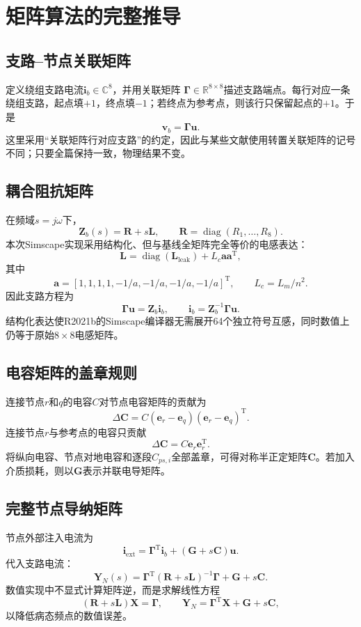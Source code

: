 \documentclass[UTF8,12pt,a4paper]{ctexart}
\newcommand{\Yn}{\bm{Y}_{N}}
\newcommand{\Zb}{\bm{Z}_{b}}
\newcommand{\Cmat}{\bm{C}}
\newcommand{\Gmat}{\bm{G}}
\newcommand{\Rmat}{\bm{R}}
\newcommand{\Lmat}{\bm{L}}
\newcommand{\Gam}{\bm{\Gamma}}
\begin{document}
\section{矩阵算法的完整推导}

\subsection{支路--节点关联矩阵}
定义绕组支路电流\(\bm{i}_b\in\mathbb{C}^{8}\)，并用关联矩阵
\(\Gam\in\mathbb{R}^{8\times 8}\)描述支路端点。每行对应一条绕组支路，起点填\( +1 \)，终点填\(-1\)；若终点为参考点，则该行只保留起点的\( +1 \)。于是
\[
\bm{v}_b=\Gam\bm{u}.
\]
这里采用“关联矩阵行对应支路”的约定，因此与某些文献使用转置关联矩阵的记号不同；只要全篇保持一致，物理结果不变。

\subsection{耦合阻抗矩阵}
在频域\(s=j\omega\)下，
\[
\Zb(s)=\Rmat+s\Lmat,\qquad
\Rmat=\operatorname{diag}(R_1,\ldots,R_8).
\]
本次Simscape实现采用结构化、但与基线全矩阵完全等价的电感表达：
\[
\boxed{\Lmat=
\operatorname{diag}(\bm{L}_{\mathrm{leak}})
+L_c\bm{a}\bm{a}^{\mathrm T}},
\]
其中
\[
\bm{a}=[1,1,1,1,-1/a,-1/a,-1/a,-1/a]^{\mathrm T},
\qquad L_c=L_m/n^2.
\]
因此支路方程为
\[
\Gam\bm{u}=\Zb\bm{i}_b,
\qquad
\bm{i}_b=\Zb^{-1}\Gam\bm{u}.
\]
结构化表达使R2021b的Simscape编译器无需展开64个独立符号互感，同时数值上仍等于原始\(8\times8\)电感矩阵。

\subsection{电容矩阵的盖章规则}
连接节点\(r\)和\(q\)的电容\(C\)对节点电容矩阵的贡献为
\[
\Delta\Cmat=C(\bm{e}_r-\bm{e}_q)(\bm{e}_r-\bm{e}_q)^{\mathrm T}.
\]
连接节点\(r\)与参考点的电容只贡献
\[
\Delta\Cmat=C\bm{e}_r\bm{e}_r^{\mathrm T}.
\]
将纵向电容、节点对地电容和逐段\(C_{ps,i}\)全部盖章，可得对称半正定矩阵\(\Cmat\)。若加入介质损耗，则以\(\Gmat\)表示并联电导矩阵。

\subsection{完整节点导纳矩阵}
节点外部注入电流为
\[
\bm{i}_{\mathrm{ext}}
=\Gam^{\mathrm T}\bm{i}_b+(\Gmat+s\Cmat)\bm{u}.
\]
代入支路电流：
\[
\boxed{
\Yn(s)
=\Gam^{\mathrm T}
(\Rmat+s\Lmat)^{-1}\Gam
+\Gmat+s\Cmat
}.
\]
数值实现中不显式计算矩阵逆，而是求解线性方程
\[
(\Rmat+s\Lmat)\bm{X}=\Gam,
\qquad
\Yn=\Gam^{\mathrm T}\bm{X}+\Gmat+s\Cmat,
\]
以降低病态频点的数值误差。
\end{document}
